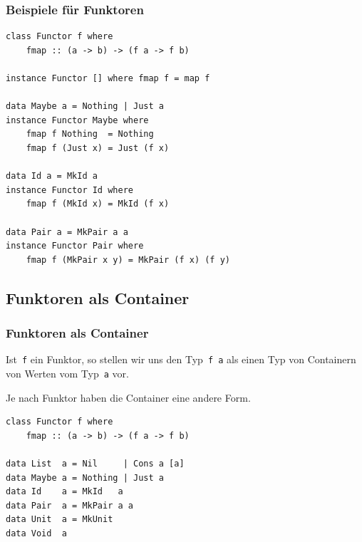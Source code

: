\documentclass[12pt,compress,ngerman,utf8,t]{beamer}
\begin{document}

\begin{frame}[fragile]\frametitle{Beispiele für Funktoren}
  \vspace*{-1em}
  \small
  \begin{verbatim}
class Functor f where
    fmap :: (a -> b) -> (f a -> f b)

instance Functor [] where fmap f = map f

data Maybe a = Nothing | Just a
instance Functor Maybe where
    fmap f Nothing  = Nothing
    fmap f (Just x) = Just (f x)

data Id a = MkId a
instance Functor Id where
    fmap f (MkId x) = MkId (f x)

data Pair a = MkPair a a
instance Functor Pair where
    fmap f (MkPair x y) = MkPair (f x) (f y)
  \end{verbatim}
\end{frame}


\subsection{Funktoren als Container}

\begin{frame}[fragile]\frametitle{Funktoren als Container}
  Ist~\texttt{f} ein Funktor, so stellen wir uns den
  Typ~\texttt{f a} als einen Typ von Containern von Werten vom
  Typ~\texttt{a} vor.
  \medskip

  Je nach Funktor haben die Container eine andere Form.

  \vfill
  \begin{verbatim}
class Functor f where
    fmap :: (a -> b) -> (f a -> f b)

data List  a = Nil     | Cons a [a]
data Maybe a = Nothing | Just a
data Id    a = MkId   a
data Pair  a = MkPair a a
data Unit  a = MkUnit
data Void  a
  \end{verbatim}
\end{frame}

\end{document}
